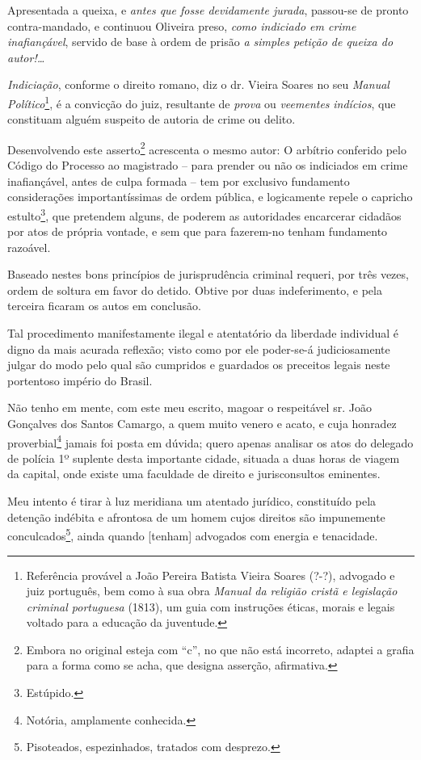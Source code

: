 Apresentada a queixa, e \emph{antes que fosse devidamente jurada},
passou-se de pronto contra-mandado, e continuou Oliveira preso,
\emph{como indiciado em crime inafiançável}, servido de base à ordem de
prisão \emph{a simples petição de queixa do autor!\ldots{}}

\emph{Indiciação}, conforme o direito romano, diz o dr. Vieira Soares no
seu \emph{Manual Político}\footnote{ Referência provável a João Pereira
  Batista Vieira Soares (?-?), advogado e juiz português, bem como à sua
  obra \emph{Manual da religião cristã e legislação criminal portuguesa}
  (1813), um guia com instruções éticas, morais e legais voltado para a
  educação da juventude.}, é a convicção do juiz, resultante de
\emph{prova} ou \emph{veementes} \emph{indícios}, que constituam alguém
suspeito de autoria de crime ou delito.

Desenvolvendo este asserto\footnote{ Embora no original esteja com ``c'',
  no que não está incorreto, adaptei a grafia para a forma como se acha,
  que designa asserção, afirmativa.} acrescenta o mesmo autor: O
arbítrio conferido pelo Código do Processo ao magistrado -- para prender
ou não os indiciados em crime inafiançável, antes de culpa formada --
tem por exclusivo fundamento considerações importantíssimas de ordem
pública, e logicamente repele o capricho estulto\footnote{ Estúpido.},
que pretendem alguns, de poderem as autoridades encarcerar cidadãos por
atos de própria vontade, e sem que para fazerem-no tenham fundamento
razoável.

Baseado nestes bons princípios de jurisprudência criminal requeri, por
três vezes, ordem de soltura em favor do detido. Obtive por duas
indeferimento, e pela terceira ficaram os autos em conclusão.

Tal procedimento manifestamente ilegal e atentatório da liberdade
individual é digno da mais acurada reflexão; visto como por ele
poder-se-á judiciosamente julgar do modo pelo qual são cumpridos e
guardados os preceitos legais neste portentoso império do Brasil.

Não tenho em mente, com este meu escrito, magoar o respeitável sr. João
Gonçalves dos Santos Camargo, a quem muito venero e acato, e cuja
honradez proverbial\footnote{ Notória, amplamente conhecida.} jamais
foi posta em dúvida; quero apenas analisar os atos do delegado de
polícia 1º suplente desta importante cidade, situada a duas horas de
viagem da capital, onde existe uma faculdade de direito e jurisconsultos
eminentes.

Meu intento é tirar à luz meridiana um atentado jurídico, constituído
pela detenção indébita e afrontosa de um homem cujos direitos são
impunemente conculcados\footnote{ Pisoteados, espezinhados, tratados
  com desprezo.}, ainda quando {[}tenham{]} advogados com energia e
tenacidade.

